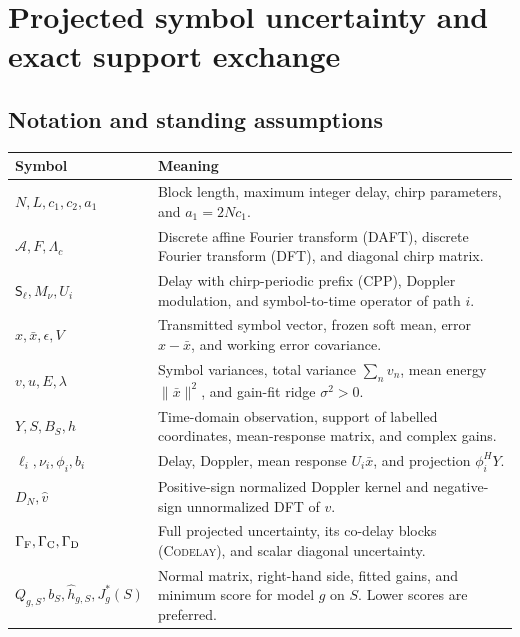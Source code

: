 \section{Projected symbol uncertainty and exact support exchange}
\label{sec:projected-uncertainty}

\theoremstyle{plain}
\newtheorem{afdmprop}{Proposition}
\newtheorem{afdmcor}{Corollary}
\theoremstyle{remark}
\newtheorem*{afdmremark}{Remark}

\subsection{Notation and standing assumptions}

\begin{center}
\small
\begin{tabular}{@{}p{.30\linewidth}p{.65\linewidth}@{}}
\hline
Symbol & Meaning \\ \hline
$N,L,c_1,c_2,a_1$ &
Block length, maximum integer delay, chirp parameters, and
$a_1=2Nc_1$. \\
$\mathcal A,F,\Lambda_c$ &
Discrete affine Fourier transform (DAFT), discrete Fourier transform
(DFT), and diagonal chirp matrix. \\
$\mathsf S_\ell,M_\nu,U_i$ &
Delay with chirp-periodic prefix (CPP), Doppler modulation, and
symbol-to-time operator of path $i$. \\
$x,\bar x,\epsilon,V$ &
Transmitted symbol vector, frozen soft mean, error $x-\bar x$,
and working error covariance. \\
$v,u,E,\lambda$ &
Symbol variances, total variance $\sum_n v_n$, mean energy
$\|\bar x\|^2$, and gain-fit ridge $\sigma^2>0$. \\
$Y,S,B_S,h$ &
Time-domain observation, support of labelled coordinates,
mean-response matrix, and complex gains. \\
$\ell_i,\nu_i,\phi_i,b_i$ &
Delay, Doppler, mean response $U_i\bar x$, and projection $\phi_i^HY$. \\
$D_N,\widehat v$ &
Positive-sign normalized Doppler kernel and negative-sign
unnormalized DFT of $v$. \\
$\Gamma_{\rm F},\Gamma_{\rm C},\Gamma_{\rm D}$ &
Full projected uncertainty, its co-delay blocks
(\textsc{Codelay}), and scalar diagonal uncertainty. \\
$Q_{g,S},b_S,\hat h_{g,S},J_g^*(S)$ &
Normal matrix, right-hand side, fitted gains, and minimum score
for model $g$ on $S$. Lower scores are preferred. \\

\end{tabular}
\end{center}
